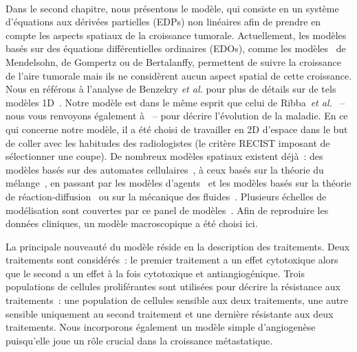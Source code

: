 \documentclass[main.tex]{subfiles}
\begin{document}
\paragraph{}
Dans le second chapitre, nous présentons le modèle, qui consiste en un système d'équations aux dérivées partielles (EDPs) non linéaires afin de prendre en compte les aspects spatiaux de la croissance tumorale. Actuellement, 
les modèles basés sur des équations différentielles ordinaires (EDOs), comme les modèles~\cite{gerlee2013model} de Mendelsohn, de Gompertz ou de 
Bertalanffy, permettent de suivre la croissance de l'aire tumorale mais ils ne considèrent aucun aspect spatial de cette croissance. Nous en référons à l'analyse de Benzekry {\it et al.} pour plus de détails sur de tels modèles 1D~\cite{benzekry2014}. 
Notre modèle est dans le même esprit que celui de Ribba~{\it et
  al.}~\cite{Ribba2006532} -- nous vous renvoyons également à~\cite{Iollo2012,gallinato2014} -- pour décrire l'évolution de la maladie. 
En ce qui concerne notre modèle, il a été choisi de travailler en 2D d'espace dans le but de coller avec les habitudes des radiologistes (le critère RECIST imposant de sélectionner une coupe). De nombreux modèles spatiaux existent déjà~: des modèles basés sur des automates  cellulaires~\cite{alarcon2003cellular,drasdo2003individual}, à ceux basés sur la théorie du mélange~\cite{ambrosi2002}, en passant par les modèles d'agents~\cite{mansury2002emerging} et les modèles basés sur la théorie de réaction-diffusion~\cite{rockne2009mathematical} ou sur la mécanique des fluides~\cite{Iollo2012}. Plusieurs échelles de modélisation sont couvertes par ce panel de modèles~\cite{cristini2010multiscale}. Afin de reproduire les données cliniques, un modèle macroscopique a été choisi ici. 

La principale nouveauté du modèle réside en la description des traitements. Deux traitements sont considérés~: le premier traitement a un effet cytotoxique alors que le second a un effet à la fois cytotoxique et antiangiogénique. Trois populations de cellules proliférantes sont utilisées pour décrire la résistance aux traitements~: une population de cellules sensible aux deux traitements, une autre sensible uniquement au second traitement et une dernière résistante aux deux traitements.  
Nous incorporons également un modèle simple d'angiogenèse puisqu'elle joue un rôle crucial dans la croissance métastatique.
\end{document}
